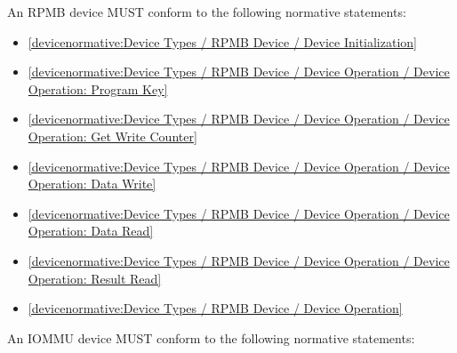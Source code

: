 \label{sec:Conformance / Device Conformance / RPMB Device Conformance}

An RPMB device MUST conform to the following normative statements:

\begin{itemize}
\item \ref{devicenormative:Device Types / RPMB Device / Device Initialization}
\item \ref{devicenormative:Device Types / RPMB Device / Device Operation / Device Operation: Program Key}
\item \ref{devicenormative:Device Types / RPMB Device / Device Operation / Device Operation: Get Write Counter}
\item \ref{devicenormative:Device Types / RPMB Device / Device Operation / Device Operation: Data Write}
\item \ref{devicenormative:Device Types / RPMB Device / Device Operation / Device Operation: Data Read}
\item \ref{devicenormative:Device Types / RPMB Device / Device Operation / Device Operation: Result Read}
\item \ref{devicenormative:Device Types / RPMB Device / Device Operation}
\end{itemize}

\label{sec:Conformance / Device Conformance / IOMMU Device Conformance}

An IOMMU device MUST conform to the following normative statements:


